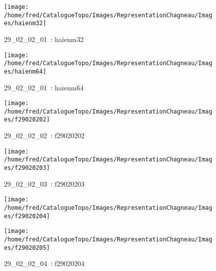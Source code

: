 \documentclass[12pt,titlepage]{book}
\begin{document}
\begin{figure}[h!]
\begin{minipage}[t]{3cm}
    \begin{center}
      \texttt{[image: /home/fred/CatalogueTopo/Images/RepresentationChagneau/Images/haienm32]}
      \caption[~29\_02\_02\_01]{\small{29\_02\_02\_01~:} \tiny{haienm32}}\label{haienm32}
    \end{center}
  \end{minipage}
  \begin{minipage}[t]{3cm}
    \begin{center}
      \texttt{[image: /home/fred/CatalogueTopo/Images/RepresentationChagneau/Images/haienm64]}
      \caption[~29\_02\_02\_01]{\small{29\_02\_02\_01~:} \tiny{haienm64}}\label{haienm64}
    \end{center}
  \end{minipage}
  \begin{minipage}[t]{3cm}
    \begin{center}
      \texttt{[image: /home/fred/CatalogueTopo/Images/RepresentationChagneau/Images/f29020202]}
      \caption[~29\_02\_02\_02]{\small{29\_02\_02\_02~:} \tiny{f29020202}}\label{f29020202}
    \end{center}
  \end{minipage}
  \begin{minipage}[t]{3cm}
    \begin{center}
      \texttt{[image: /home/fred/CatalogueTopo/Images/RepresentationChagneau/Images/f29020203]}
      \caption[~29\_02\_02\_03]{\small{29\_02\_02\_03~:} \tiny{f29020203}}\label{f29020203}
    \end{center}
  \end{minipage}
  \begin{minipage}[t]{3cm}
    \begin{center}
      \texttt{[image: /home/fred/CatalogueTopo/Images/RepresentationChagneau/Images/f29020204]}
      \caption[~29\_02\_02\_04]{\small{29\_02\_02\_04~:} \tiny{f29020204}}\label{f29020204}
    \end{center}
  \end{minipage}
  \begin{minipage}[t]{3cm}
    \begin{center}
      \texttt{[image: /home/fred/CatalogueTopo/Images/RepresentationChagneau/Images/f29020205]}

\end{center}
\end{minipage}
\end{figure}
\end{document}
